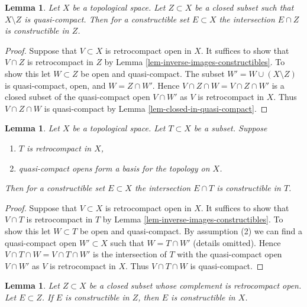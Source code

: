 \documentclass{ujarticle}
\newtheorem{lem}[thm]{Lemma}
\begin{document}
\begin{lem}
\label{lem-intersect-constructible-with-closed}
Let $X$ be a topological space. Let $Z \subset X$ be a closed
subset such that $X \setminus Z$ is quasi-compact.
Then for a constructible set $E \subset X$ the intersection
$E \cap Z$ is constructible in $Z$.
\end{lem}

\begin{proof}
Suppose that $V \subset X$ is retrocompact open in $X$.
It suffices to show that $V \cap Z$ is retrocompact in $Z$
by Lemma \ref{lem-inverse-images-constructibles}. To show this
let $W \subset Z$ be open and quasi-compact. The subset
$W' = W \cup (X \setminus Z)$ is quasi-compact, open, and $W = Z \cap W'$.
Hence $V \cap Z \cap W = V \cap Z \cap W'$
is a closed subset of the quasi-compact open $V \cap W'$
as $V$ is retrocompact in $X$. Thus $V \cap Z \cap W$ is quasi-compact
by Lemma \ref{lem-closed-in-quasi-compact}.
\end{proof}

\begin{lem}
\label{lem-intersect-constructible-with-retrocompact}
Let $X$ be a topological space. Let $T \subset X$ be a subset. Suppose
\begin{enumerate}
\item $T$ is retrocompact in $X$,
\item quasi-compact opens form a basis for the topology on $X$.
\end{enumerate}
Then for a constructible set $E \subset X$ the intersection $E \cap T$ is
constructible in $T$.
\end{lem}

\begin{proof}
Suppose that $V \subset X$ is retrocompact open in $X$.
It suffices to show that $V \cap T$ is retrocompact in $T$
by Lemma \ref{lem-inverse-images-constructibles}. To show this
let $W \subset T$ be open and quasi-compact. By assumption (2)
we can find a quasi-compact open $W' \subset X$
such that $W = T \cap W'$ (details omitted).
Hence $V \cap T \cap W = V \cap T \cap W'$
is the intersection of $T$ with  the quasi-compact open $V \cap W'$
as $V$ is retrocompact in $X$. Thus $V \cap T \cap W$ is quasi-compact.
\end{proof}

\begin{lem}
\label{lem-closed-constructible-image}
Let $Z \subset X$ be a closed subset whose complement is retrocompact open.
Let $E \subset Z$. If $E$ is constructible in $Z$, then $E$ is constructible
in $X$.
\end{lem}
\end{document}
